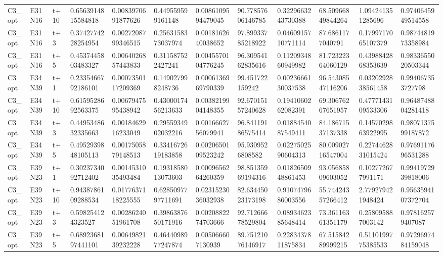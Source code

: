 \begin{landscape}
\begin{longtable}{llllllllllll}
C3\_opt & E31N16 & t+10 & 0.6563914815584818 & 0.0083970691877626 & 0.449559599161148 & 0.0086109594479045 & 90.77857606146785 & 0.3229663243730388 & 68.50966849844264 & 1.094241351285696 & 0.9740645949514558 \\
C3\_opt & E31N16 & t+3 & 0.3742774228254954 & 0.0027208799346515 & 0.2563158373037974 & 0.0018162640038652 & 97.89933785218922 & 0.0460915710771114 & 87.6861177040791 & 0.1799717065107379 & 0.9874481973358984 \\
C3\_opt & E31N16 & t+5 & 0.4537445803483327 & 0.0064026857443833 & 0.311587522427241 & 0.0045570104776245 & 96.30954162835616 & 0.1120934860949982 & 81.72322364060129 & 0.4398842868353639 & 0.9833655020503344 \\
C3\_opt & E34N39 & t+1 & 0.2335466792186101 & 0.0007350117209369 & 0.149027998248736 & 0.0006136969790339 & 99.451722159242 & 0.0023666130037538 & 96.54308547116206 & 0.0320292838561458 & 0.994067353727798 \\
C3\_opt & E34N39 & t+10 & 0.6159528692563375 & 0.0067947595438942 & 0.4300017456213633 & 0.0038219904148355 & 92.67015157240628 & 0.1941060262082391 & 69.30676267651957 & 0.4777143109533306 & 0.9648748804281418 \\
C3\_opt & E34N39 & t+3 & 0.4495348632335663 & 0.0018462916233049 & 0.2955934902032216 & 0.0016662756079941 & 96.84119186575414 & 0.0188454087549411 & 84.18671537137338 & 0.1457029863922995 & 0.9807137599187872 \\
C3\_opt & E34N39 & t+5 & 0.4952939848105113 & 0.0017505879148513 & 0.3341672619183858 & 0.0020650109523242 & 95.9309526808582 & 0.0227502590604313 & 80.00902716547004 & 0.2274462831015424 & 0.9769117696531288 \\
C3\_opt & E39N23 & t+1 & 0.3023734092712402 & 0.0014531035493484 & 0.1931858013073603 & 0.0009656264260359 & 98.85135969194316 & 0.0182650948861453 & 93.05685809603052 & 0.102772677991171 & 0.9941972939818006 \\
C3\_opt & E39N23 & t+10 & 0.9438786109288534 & 0.0177637118225555 & 0.6285097797711691 & 0.0231523036032938 & 82.63445023173198 & 0.9107479686003556 & 55.74424357266412 & 2.779279421948424 & 0.9563594107372704 \\
C3\_opt & E39N23 & t+3 & 0.598254124323527 & 0.0028624051961708 & 0.3986387650171916 & 0.0020882274703666 & 92.71266678529804 & 0.0893462385648414 & 73.36116361351179 & 0.258095887003142 & 0.978162579407087 \\
C3\_opt & E39N23 & t+5 & 0.6892368197441101 & 0.0064982139232228 & 0.4644098977247874 & 0.005066607130939 & 89.75121076146917 & 0.2283437811875834 & 67.51584289999215 & 0.5110199775385533 & 0.9729697484159048 \\

\end{longtable}
\end{landscape}
